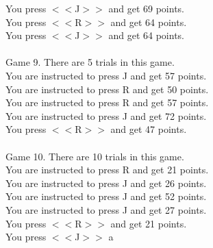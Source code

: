 \documentclass[pdflatex,sn-nature]{sn-jnl}%
\theoremstyle{thmstyleone}%
\theoremstyle{thmstyletwo}%
\theoremstyle{thmstylethree}%
\begin{document}
You press $<<$J$>>$ and get 69 points. $~$\\ 
You press $<<$R$>>$ and get 64 points. $~$\\ 
You press $<<$J$>>$ and get 64 points. $~$\\ 
 $~$\\ 
Game 9. There are 5 trials in this game. $~$\\ 
You are instructed to press J and get 57 points. $~$\\ 
You are instructed to press R and get 50 points. $~$\\ 
You are instructed to press R and get 57 points. $~$\\ 
You are instructed to press J and get 72 points. $~$\\ 
You press $<<$R$>>$ and get 47 points. $~$\\ 
 $~$\\ 
Game 10. There are 10 trials in this game. $~$\\ 
You are instructed to press R and get 21 points. $~$\\ 
You are instructed to press J and get 26 points. $~$\\ 
You are instructed to press J and get 52 points. $~$\\ 
You are instructed to press J and get 27 points. $~$\\ 
You press $<<$R$>>$ and get 21 points. $~$\\ 
You press $<<$J$>>$ a 
\end{document}
